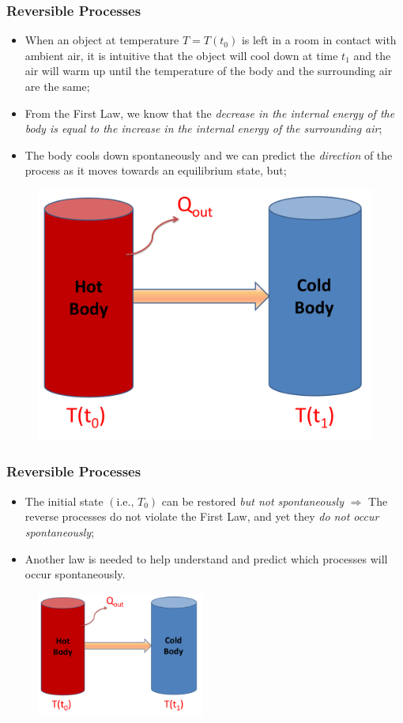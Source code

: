 \documentclass[10pt,compress,handout,ignorenonframetext]{beamer}
\begin{document}
\begin{frame}
 \frametitle{Reversible Processes}
   \begin{itemize}
    \item When an object at temperature $T=T\left(t_{0}\right)$ is left in a room in contact with ambient air, it is intuitive that the object will cool down at time $t_{1}$ and the air will warm up until the temperature of the body and the surrounding air are the same;
    \item From the First Law, we know that the {\it decrease in the internal energy of the body is equal to the increase in the internal energy of the surrounding air};
    \item The body cools down spontaneously and we can predict the {\it direction} of the process as it moves towards an equilibrium state, but; 
   \end{itemize}
    \begin{figure}%
     \begin{center}
      \includegraphics[width=5.cm,clip]{./Pics/HotColdCoffee}
     \end{center}
    \end{figure}
 \normalsize
\end{frame}


\begin{frame}
 \frametitle{Reversible Processes}
   \begin{itemize}
    \item The initial state $\left(\text{i.e., }T_{0}\right)$ can be restored {\it but not spontaneously} $\Longrightarrow$  The reverse processes do not violate the First Law, and yet they {\it do not occur spontaneously};
    \item Another law is needed to help understand and predict which processes will occur spontaneously.
   \end{itemize}
    \begin{figure}%
     \begin{center}
      \includegraphics[width=5.5cm,clip]{./Pics/HotColdCoffee}
     \end{center}
    \end{figure}
 \normalsize
\end{frame}
\end{document}
